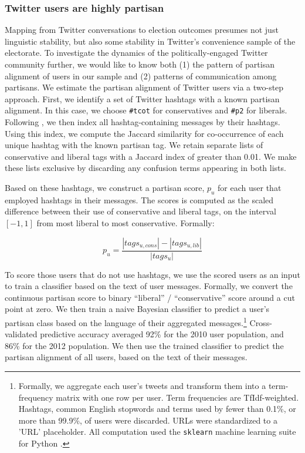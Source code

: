\documentclass{article}
\begin{document}
\subsubsection{Twitter users are highly partisan}
\label{sec:part-cont-twitt}

Mapping from Twitter conversations to election outcomes presumes not
just linguistic stability, but also some stability in Twitter's
convenience sample of the electorate. To investigate the dynamics of the
politically-engaged Twitter community further, we would like to know
both (1) the pattern of partisan alignment of users in our sample and
(2) patterns of communication among partisans. We estimate the
partisan alignment of Twitter users via a two-step approach. First, we
identify a set of Twitter hashtags with a known partisan alignment. In
this case, we choose \texttt{\#tcot} for conservatives and
\texttt{\#p2} for liberals. Following \cite{conover2011}, we then
index all hashtag-containing messages by their hashtags. Using this
index, we compute the Jaccard similarity for co-occurrence of each
unique hashtag with the known partisan tag. We retain separate lists
of conservative and liberal tags with a Jaccard index of greater than
0.01. We make these lists exclusive by discarding any confusion terms
appearing in both lists.

Based on these hashtags, we construct a partisan score, $p_u$ for each
user that employed hashtags in their messages. The scores is computed
as the scaled difference between their use of conservative and liberal
tags, on the interval $[-1, 1]$ from most liberal to most
conservative. Formally:

 \begin{equation}
   \label{eq:pscore}
   p_u = \frac{\left|tags_{u,cons}\right| - \left|tags_{u, lib}\right|}{\left|tags_u\right|}
 \end{equation}

To score those users that do not use hashtags, we use the scored users
as an input to train a classifier based on the text of user
messages. Formally, we convert the continuous partisan score to binary
``liberal'' / ``conservative'' score around a cut point at zero. We
then train a naive Bayesian classifier to predict a user's
partisan class based on the language of their aggregated
messages.\footnote{Formally, we aggregate each user's tweets and
transform them into a term-frequency matrix with one row per
user. Term frequencies are TfIdf-weighted. Hashtags,
common English stopwords and terms used by fewer than 0.1\%, or more
than 99.9\%, of users were discarded. URLs were standardized to a
'URL' placeholder. All computation used the \texttt{sklearn} machine
learning suite for Python \citep{scikit-learn}.} Cross-validated
predictive accuracy averaged 92\% for the 2010 user population, and
86\% for the 2012 population. We then use the trained classifier to
predict the partisan alignment of all users, based on the text of
their messages.
\end{document}
